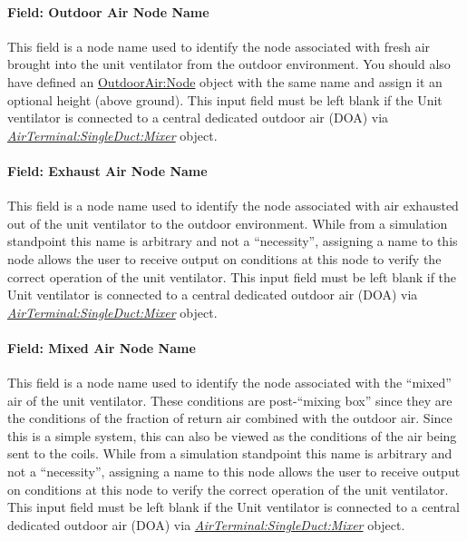 \paragraph{Field: Outdoor Air Node Name}\label{field-outdoor-air-node-name-001}

This field is a node name used to identify the node associated with fresh air brought into the unit ventilator from the outdoor environment. You should also have defined an \hyperref[outdoorairnode]{OutdoorAir:Node} object with the same name and assign it an optional height (above ground). This input field must be left blank if the Unit ventilator is connected to a central dedicated outdoor air (DOA) via \textit{\hyperref[airterminalsingleductmixer]{AirTerminal:SingleDuct:Mixer}} object.

\paragraph{Field: Exhaust Air Node Name}\label{field-exhaust-air-node-name-000}

This field is a node name used to identify the node associated with air exhausted out of the unit ventilator to the outdoor environment. While from a simulation standpoint this name is arbitrary and not a ``necessity'', assigning a name to this node allows the user to receive output on conditions at this node to verify the correct operation of the unit ventilator. This input field must be left blank if the Unit ventilator is connected to a central dedicated outdoor air (DOA) via \textit{\hyperref[airterminalsingleductmixer]{AirTerminal:SingleDuct:Mixer}} object.

\paragraph{Field: Mixed Air Node Name}\label{field-mixed-air-node-name-001}

This field is a node name used to identify the node associated with the ``mixed'' air of the unit ventilator. These conditions are post-``mixing box'' since they are the conditions of the fraction of return air combined with the outdoor air. Since this is a simple system, this can also be viewed as the conditions of the air being sent to the coils. While from a simulation standpoint this name is arbitrary and not a ``necessity'', assigning a name to this node allows the user to receive output on conditions at this node to verify the correct operation of the unit ventilator. This input field must be left blank if the Unit ventilator is connected to a central dedicated outdoor air (DOA) via \textit{\hyperref[airterminalsingleductmixer]{AirTerminal:SingleDuct:Mixer}} object.

